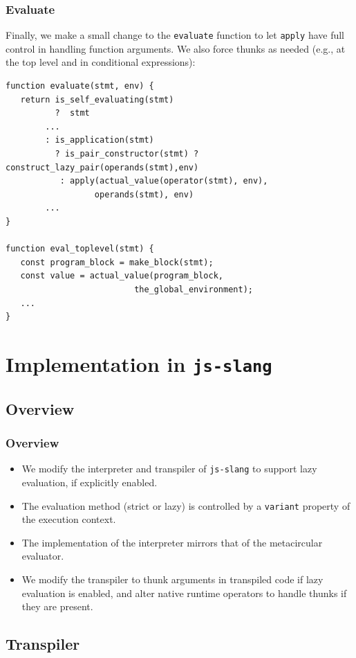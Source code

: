 \documentclass[12pt]{beamer}
\begin{document}
\begin{frame}[fragile]
\frametitle{Evaluate}
Finally, we make a small change to the \texttt{evaluate} function to let \texttt{apply} have full control in handling function arguments. We also force thunks as needed (e.g., at the top level and in conditional expressions):
\begin{lstlisting}
function evaluate(stmt, env) {
   return is_self_evaluating(stmt)
          ?  stmt
        ...
        : is_application(stmt)
          ? is_pair_constructor(stmt) ? construct_lazy_pair(operands(stmt),env) 
           : apply(actual_value(operator(stmt), env),
                  operands(stmt), env)
        ...
}

function eval_toplevel(stmt) {
   const program_block = make_block(stmt);
   const value = actual_value(program_block, 
                          the_global_environment);
   ...
}
\end{lstlisting}
\end{frame}

\section{Implementation in \texttt{js-slang}}

\subsection{Overview}

\begin{frame}
\frametitle{Overview}
\begin{itemize}
\item<1-> We modify the interpreter and transpiler of \texttt{js-slang} to support lazy evaluation, if explicitly enabled.
\item<2-> The evaluation method (strict or lazy) is controlled by a \texttt{variant} property of the execution context.
\item<3-> The implementation of the interpreter mirrors that of the metacircular evaluator.
\item<4-> We modify the transpiler to thunk arguments in transpiled code if lazy evaluation is enabled, and alter native runtime operators to handle thunks if they are present.
\end{itemize}
\end{frame}

\subsection{Transpiler}
\end{document}
